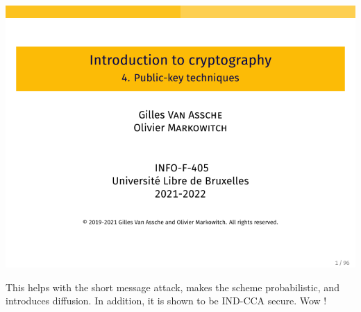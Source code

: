 \documentclass[../Cryptography.tex]{subfiles}
\begin{document}
\begin{center}
    \includegraphics[width=0.8\linewidth, page=47]{Slides/4-Public.pdf}
\end{center}
This helps with the short message attack, makes the scheme probabilistic, and introduces diffusion. In addition, it is shown to be IND-CCA secure. Wow !
\end{document}
